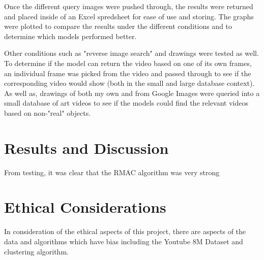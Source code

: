 \documentclass[10pt,twocolumn]{article}
\begin{document}
Once the different query images were pushed through, the results were returned and placed inside of an Excel spredsheet for ease of use and storing. The graphs were plotted to compare the results under the different conditions and to determine which models performed better.

Other conditions such as "reverse image search" and drawings were tested as well. To determine if the model can return the video based on one of its own frames, an individual frame was picked from the video and passed through to see if the corresponding video would show (both in the small and large database context). As well as, drawings of both my own and from Google Images were queried into a small database of art videos to see if the models could find the relevant videos based on non-"real" objects.

\section{Results and Discussion}

From testing, it was clear that the RMAC algorithm was very strong 


\section {Ethical Considerations}



In consideration of the ethical aspects of this project, there are aspects of the data and algorithms which have bias including the Youtube 8M Dataset and clustering algorithm.

\end{document}
